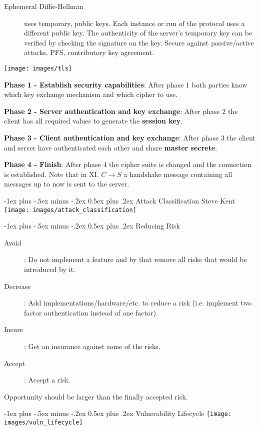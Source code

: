 \documentclass[a4paper,twocolumn]{article}
\makeatletter
\renewcommand{\section}{%
    \@startsection{section}{1}{0mm}%
    {-1ex plus -.5ex minus -.2ex}%
    {0.5ex plus .2ex}%
    {\normalfont\normalsize\bfseries\sectionrule{12pt}{0.4pt}{0pt}{0pt}}
}
\makeatother
\begin{document}
\begin{footnotesize}
\begin{description}
\item[Ephemeral Diffie-Hellman] uses temporary, public keys. Each instance or run of the protocol uses a different public key. The authenticity of the server's temporary key can be verified by checking the signature on the key. Secure against passive/active attacks, PFS, contributory key agreement.
\end{description}

\texttt{[image: images/tls]}

\textbf{Phase 1 - Establish security capabilities}: After phase 1 both parties know which key exchange mechanism and which cipher to use.

\textbf{Phase 2 - Server authentication and key exchange}: After phase 2 the client has all required values to generate the \textbf{session key}.

\textbf{Phase 3 - Client authentication and key exchange}: After phase 3 the client and server have authenticated each other and share \textbf{master secrete}.

\textbf{Phase 4 - Finish}: After phase 4 the cipher suite is changed and the connection is established. Note that in XI. $C \rightarrow S$ a handshake message containing all messages up to now is sent to the server.

\section{Attack Classification Steve Kent}
\texttt{[image: images/attack\_classification]}

\section{Reducing Risk}
\begin{description}
\item[Avoid]: Do not implement a feature and by that remove all risks that would be introduced by it.
\item[Decrease]: Add implementations/hardware/etc. to reduce a risk (i.e. implement two factor authentication instead of one factor).
\item[Insure]: Get an insurance against some of the risks.
\item[Accept]: Accept a risk.
\end{description}

Opportunity should be larger than the finally accepted risk.

\section{Vulnerability Lifecycle}
\texttt{[image: images/vuln\_lifecycle]}


\end{footnotesize}
\end{document}
